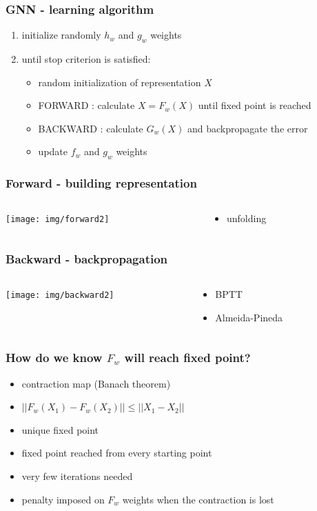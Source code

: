 \documentclass{beamer}
\begin{document}
\begin{frame}
\frametitle{GNN - learning algorithm}
\begin{enumerate}
	\item initialize randomly $h_w$ and $g_w$ weights
	\item until stop criterion is satisfied:
	\begin{itemize}
		\item random initialization of representation $X$
		\item FORWARD : calculate $X = F_w(X)$ until fixed point is reached
		\item BACKWARD : calculate $G_w(X)$ and backpropagate the error
		\item update $f_w$ and $g_w$ weights
	\end{itemize}
\end{enumerate}
\end{frame}

\begin{frame}
\frametitle{Forward - building representation}
\begin{columns}
	\begin{column}{0.66\textwidth}
		\texttt{[image: img/forward2]}
	\end{column}
	\begin{column}{0.34\textwidth}
		\begin{itemize}
			\item unfolding
		\end{itemize}
	\end{column}
\end{columns}
\end{frame}

\begin{frame}
\frametitle{Backward - backpropagation}
\begin{columns}
	\begin{column}{0.66\textwidth}
		\texttt{[image: img/backward2]}
	\end{column}
	\begin{column}{0.34\textwidth}
		\begin{itemize}
			\item BPTT
			\item Almeida-Pineda
		\end{itemize}
	\end{column}
\end{columns}
\end{frame}

\begin{frame}
\frametitle{How do we know $F_w$ will reach fixed point?}
\begin{itemize}
	\item contraction map (Banach theorem)
	\item $||F_w(X_1) - F_w(X_2)|| \leq ||X_1 - X_2||$
	\item unique fixed point
	\item fixed point reached from every starting point
	\item very few iterations needed
	\item penalty imposed on $F_w$ weights when the contraction is lost
\end{itemize}
\end{frame}
\end{document}
